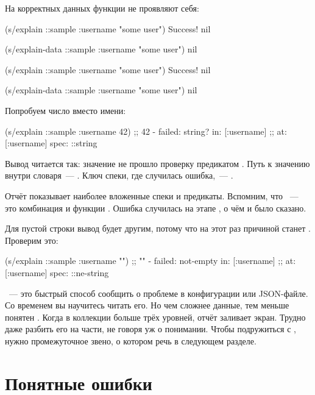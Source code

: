 \noindent
На корректных данных функции не проявляют себя:

\ifnarrow


\begin{clojure}
(s/explain ::sample
  {:username "some user"})
Success!
nil

(s/explain-data ::sample
  {:username "some user"})
nil
\end{clojure}


\else


\begin{clojure}
(s/explain ::sample {:username "some user"})
Success!
nil

(s/explain-data ::sample {:username "some user"})
nil
\end{clojure}


\fi

\noindent
Попробуем число вместо имени:


\begin{clojure}
(s/explain ::sample {:username 42})
;; 42 - failed: string? in: [:username]
;; at: [:username] spec: ::string
\end{clojure}


Вывод читается так: значение  не прошло проверку предикатом
. Путь к значению внутри словаря~--- \code{[:username]}. Ключ
спеки, где случилась ошибка,~--- .

Отчёт показывает наиболее вложенные спеки и предикаты. Вспомним, что
~--- это комбинация  и функции
. Ошибка случилась на этапе , о чём и было
сказано.

Для пустой строки вывод будет другим, потому что на этот раз причиной станет
. Проверим это:


\begin{clojure}
(s/explain ::sample {:username ""})
;; "" - failed: not-empty in: [:username]
;; at: [:username] spec: ::ne-string
\end{clojure}


~--- это быстрый способ сообщить о проблеме в конфигурации или
JSON-файле. Со временем вы научитесь читать его. Но чем сложнее данные, тем
меньше понятен . Когда в коллекции больше трёх уровней,
отчёт заливает экран. Трудно даже разбить его на части, не говоря уж о
понимании. Чтобы подружиться с , нужно промежуточное звено, о
котором речь в следующем разделе.

\section{Понятные ошибки}

